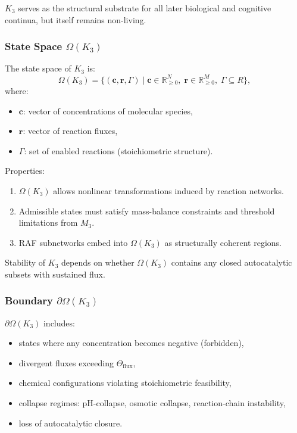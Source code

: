 $K_3$ serves as the structural substrate for all later biological and
cognitive continua, but itself remains non-living.

\subsubsection{State Space \texorpdfstring{$\Omega(K_3)$}{\Omega(K_3)}}

The state space of $K_3$ is:
\[
\Omega(K_3) = \{ (\mathbf{c}, \mathbf{r}, \Gamma) \mid
\mathbf{c} \in \mathbb{R}_{\ge0}^N,\;
\mathbf{r} \in \mathbb{R}_{\ge0}^M,\;
\Gamma \subseteq R \},
\]
where:
\begin{itemize}
    \item $\mathbf{c}$: vector of concentrations of molecular species,
    \item $\mathbf{r}$: vector of reaction fluxes,
    \item $\Gamma$: set of enabled reactions (stoichiometric structure).
\end{itemize}

Properties:
\begin{enumerate}
    \item $\Omega(K_3)$ allows nonlinear transformations induced by
          reaction networks.
    \item Admissible states must satisfy mass-balance constraints and
          threshold limitations from $M_3$.
    \item RAF subnetworks embed into $\Omega(K_3)$ as structurally
          coherent regions.
\end{enumerate}

Stability of $K_3$ depends on whether $\Omega(K_3)$ contains any closed
autocatalytic subsets with sustained flux.

\subsubsection{Boundary \texorpdfstring{$\partial\Omega(K_3)$}{\partial\Omega(K_3)}}

$\partial\Omega(K_3)$ includes:
\begin{itemize}
    \item states where any concentration becomes negative (forbidden),
    \item divergent fluxes exceeding $\Theta_{\mathrm{flux}}$,
    \item chemical configurations violating stoichiometric feasibility,
    \item collapse regimes: pH-collapse, osmotic collapse,
          reaction-chain instability,
    \item loss of autocatalytic closure.
\end{itemize}

